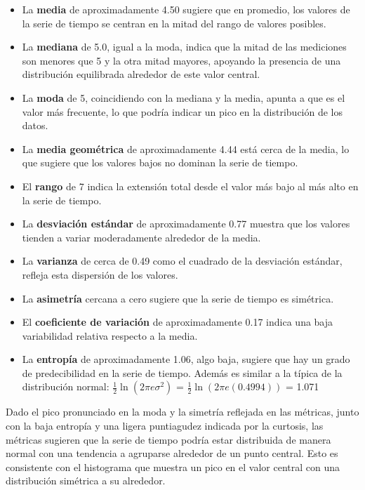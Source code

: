 \documentclass[11pt]{article} %
\begin{document}
	 \begin{itemize}
	 	\item La \textbf{media} de aproximadamente 4.50 sugiere que en promedio, los valores de la serie de tiempo se centran en la mitad del rango de valores posibles.
	 	\item La \textbf{mediana} de 5.0, igual a la moda, indica que la mitad de las mediciones son menores que 5 y la otra mitad mayores, apoyando la presencia de una distribución equilibrada alrededor de este valor central.
	 	\item La \textbf{moda} de 5, coincidiendo con la mediana y la media, apunta a que es el valor más frecuente, lo que podría indicar un pico en la distribución de los datos.
	 	\item La \textbf{media geométrica} de aproximadamente 4.44 está cerca de la media, lo que sugiere que los valores bajos no dominan la serie de tiempo.
	 	\item El \textbf{rango} de 7 indica la extensión total desde el valor más bajo al más alto en la serie de tiempo.
	 	\item La \textbf{desviación estándar} de aproximadamente 0.77 muestra que los valores tienden a variar moderadamente alrededor de la media.
	 	\item La \textbf{varianza} de cerca de 0.49 como el cuadrado de la desviación estándar, refleja esta dispersión de los valores.
	 	\item La \textbf{asimetría} cercana a cero sugiere que la serie de tiempo es simétrica.
	 	\item El \textbf{coeficiente de variación} de aproximadamente 0.17 indica una baja variabilidad relativa respecto a la media.
	 	\item La \textbf{entropía} de aproximadamente 1.06, algo baja, sugiere que hay un grado de predecibilidad en la serie de tiempo.  Además es similar a la típica de la distribución normal: \(\frac{1}{2} \ln(2 \pi e \sigma^2)\) = \(\frac{1}{2} \ln(2 \pi e (0.4994))\) = 1.071
	 \end{itemize}
	 
	 Dado el pico pronunciado en la moda y la simetría reflejada en las métricas, junto con la baja entropía y una ligera puntiagudez indicada por la curtosis, las métricas sugieren que la serie de tiempo podría estar distribuida de manera normal con una tendencia a agruparse alrededor de un punto central. Esto es consistente con el histograma que muestra un pico en el valor central con una distribución simétrica a su alrededor.
	 
\end{document}
